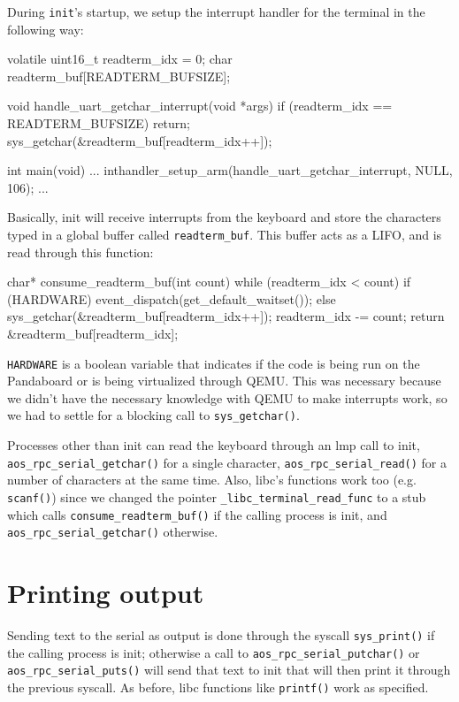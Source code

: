 \documentclass[a4paper,twoside,openright]{report}
\renewcommand{\t}[1]{%
	{\texttt{#1}}}
\begin{document}
During \t{init}'s startup, we setup the interrupt handler for the terminal
in the following way:
\begin{pandacode}
volatile uint16_t readterm_idx = 0;
char readterm_buf[READTERM_BUFSIZE];

void handle_uart_getchar_interrupt(void *args) {
	if (readterm_idx == READTERM_BUFSIZE) return;
	sys_getchar(&readterm_buf[readterm_idx++]);
}

int main(void) {
	...
	inthandler_setup_arm(handle_uart_getchar_interrupt, NULL, 106);
	...
}
\end{pandacode}

Basically, init will receive interrupts from the keyboard and store the characters 
typed in a global buffer called \t{readterm\_buf}. This buffer acts as a LIFO, 
and is read through this function:

\begin{pandacode}
char* consume_readterm_buf(int count) {
	while (readterm_idx < count) {
		if (HARDWARE) {
			event_dispatch(get_default_waitset());
		} else {
			sys_getchar(&readterm_buf[readterm_idx++]);
		}
	}
	readterm_idx -= count;
	return &readterm_buf[readterm_idx];
}
\end{pandacode}

\t{HARDWARE} is a boolean variable that indicates if the code is being run on
the Pandaboard or is being virtualized through QEMU. This was necessary because
we didn't have the necessary knowledge with QEMU to make interrupts work, so we
had to settle for a blocking call to \t{sys\_getchar()}.

Processes other than init can read the keyboard through an lmp call to init,
\t{aos\_rpc\_serial\_getchar()} for a single character,
\t{aos\_rpc\_serial\_read()} for a number of characters at the same time.
Also, libc's functions work too (e.g. \t{scanf()}) since we changed the pointer
\t{\_libc\_terminal\_read\_func} to a stub which calls
\t{consume\_readterm\_buf()} if the calling process is init, and
\t{aos\_rpc\_serial\_getchar()} otherwise.


\section{Printing output}

Sending text to the serial as output is done through the syscall
\t{sys\_print()} if the calling process is init; otherwise a call to
\t{aos\_rpc\_serial\_putchar()} or \t{aos\_rpc\_serial\_puts()} will send that
text to init that will then print it through the previous syscall.
As before, libc functions like \t{printf()} work as specified.
\end{document}

